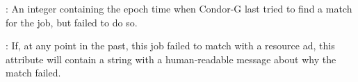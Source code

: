 \begin{description}
\item[\AdAttr{LastRejMatchTime}] :  An integer containing the epoch
time when Condor-G last tried to find a match for the job,
but failed to do so.

\item[\AdAttr{LastRejMatchReason}] :  If, at any point in the past,
this job failed to match with a resource ad,
this attribute will contain a string with a
human-readable message about why the match failed.

\end{description}
